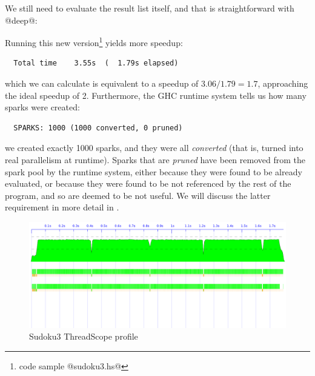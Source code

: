 We still need to evaluate the result list itself, and that is
straightforward with @deep@:


\noindent Running this new version\footnote{code sample @sudoku3.hs@}
yields more speedup:

{\small \begin{verbatim}
  Total time    3.55s  (  1.79s elapsed)
\end{verbatim}}

\noindent which we can calculate is equivalent to a speedup of
$3.06/1.79 = 1.7$, approaching the ideal speedup of 2.  Furthermore,
the GHC runtime system tells us how many sparks were created:

{\small \begin{verbatim}
  SPARKS: 1000 (1000 converted, 0 pruned)
\end{verbatim}}

\noindent we created exactly 1000 sparks, and they were all
\emph{converted} (that is, turned into real parallelism at runtime).
Sparks that are \emph{pruned} have been removed from the spark pool by
the runtime system, either because they were found to be already
evaluated, or because they were found to be not referenced by the rest
of the program, and so are deemed to be not useful.  We will discuss
the latter requirement in more detail in .

\begin{figure}
\begin{center}
\includegraphics[scale=0.4]{sudoku3.png}
\end{center}
\caption{Sudoku3 ThreadScope profile}
\label{fig:sudoku3-threadscope}
\end{figure}

